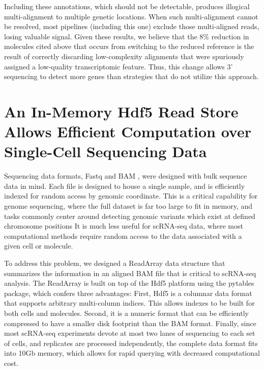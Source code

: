 Including these annotations, which should not be detectable, produces illogical multi-alignment to multiple genetic locations. 
When such multi-alignment cannot be resolved, most pipelines (including this one) exclude those multi-aligned reads, losing valuable signal. 
Given these results, we believe that the 8\% reduction in molecules cited above that occurs from switching to the reduced reference is the result of correctly discarding low-complexity alignments that were spuriously assigned a low-quality transcriptomic feature.
Thus, this change allows 3' sequencing to detect more genes than strategies that do not utilize this approach.  

\section{An In-Memory Hdf5 Read Store Allows Efficient Computation over Single-Cell Sequencing Data} 

Sequencing data formats, Fastq \citep{Cock2009} and BAM \citep{Li2009}, were designed with bulk sequence data in mind.
Each file is designed to house a single sample, and is efficiently indexed for random access by genomic coordinate. 
This is a critical capability for genome sequencing, where the full dataset is far too large to fit in memory, and tasks commonly center around detecting genomic variants which exist at defined chromosome positions \citep{McKenna2010}
It is much less useful for scRNA-seq data, where most computational methods require random access to the data associated with a given cell or molecule. 

To address this problem, we designed a ReadArray data structure that summarizes the information in an aligned BAM file that is critical to scRNA-seq analysis. 
The ReadArray is built on top of the {\mono Hdf5} platform \citep{HDFGroup1997-2017} using the {\mono pytables} package, which confers three advantages: 
First, Hdf5 is a columnar data format that supports arbitrary multi-column indices. 
This allows indexes to be built for both cells and molecules. 
Second, it is a numeric format that can be efficiently compressed \citep{Alted2010} to have a smaller disk footprint than the BAM format. 
Finally, since most scRNA-seq experiments devote at most two lanes of sequencing to each set of cells, and replicates are processed independently, the complete data format fits into 10Gb memory, which allows for rapid querying with decreased computational cost. 

